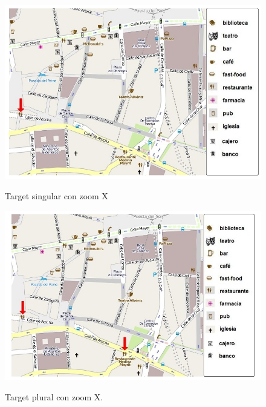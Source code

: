 \begin{figure}
\centering
\includegraphics[width=\textwidth]{figures/rest-singular.png}\\[0pt]
\vspace*{.1cm}
\caption{Target singular con zoom X}
\label{rest-singular}
\end{figure}

\begin{figure}
\centering
\includegraphics[width=\textwidth]{figures/rest-plural.png}\\[0pt]
\vspace*{.1cm}
\caption{Target plural con zoom X.}
\label{rest-plural}
\end{figure}

